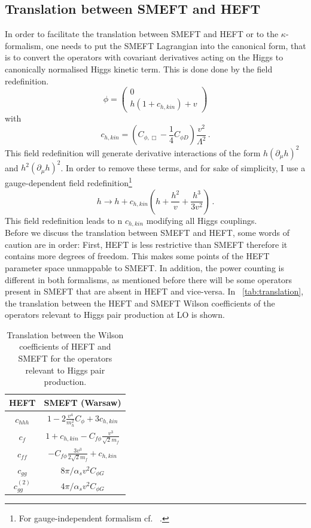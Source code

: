 \subsection{Translation between SMEFT and HEFT }
In order to facilitate the translation between SMEFT and HEFT or to the $\kappa$-formalism, one needs to put the SMEFT Lagrangian into the canonical form, that is to convert the operators with covariant derivatives acting on the Higgs to  canonically normalised Higgs kinetic term. This is done done by the field redefinition.
\begin{equation}
	\phi=\left( \begin{array}{c} 0 \\ h(1+c_{h,kin}) + v \end{array} \right)
\end{equation} 
with 
\begin{equation}
	c_{h,kin}=\left(C_{\phi,\Box}-\frac{1}{4}C_{\phi D}\right) \frac{v^2}{\Lambda^2}\,.
\end{equation}
This field redefinition will generate derivative interactions of the form $h(\partial_{\mu}h)^2$ and $h^2(\partial_{\mu}h)^2$. In order to remove these terms, and for sake of simplicity, I use a gauge-dependent field redefinition\footnote{For gauge-independent formalism cf.~ \cite{Hartmann:2015aia}.}
\begin{equation}
	h \to h + c_{h,kin}\left( h +\frac{h^2}{v}+\frac{h^3}{3v^2}\right)\,. \label{fieldref}
\end{equation}
This field redefinition leads to n $c_{h,kin}$ modifying all Higgs couplings. \\
 Before we discuss the translation between SMEFT and HEFT, some words of caution are in order: First, HEFT is less restrictive than SMEFT therefore it contains more degrees of freedom. This makes some points of the HEFT parameter space unmappable to SMEFT. In addition, the power counting is different in both formalisms, as mentioned before there will be some operators present in SMEFT that are absent in HEFT and vice-versa.  In ~\autoref{tab:translation}, the translation between the HEFT and SMEFT Wilson coefficients of the  operators relevant to Higgs pair production at LO is shown. 
\begin{table}[htb]
	\begin{center}
		\begin{tabular}{ c c }
			\toplinetwo
			HEFT& SMEFT (Warsaw)\\
			\midrule
			$c_{hhh}$&$1-2\frac{v^4}{m_h^2}C_\phi+3c_{h,kin}$ \\
			$c_f$ & $1+c_{h,kin} -C_{f\phi} \frac{v^3}{\sqrt{2} m_f}$\\
			$ c_{ff} $ &$-C_{f\phi} \frac{3 v^3}{2\sqrt{2} m_f} + c_{h,kin}$\\
			$c_{gg}$  & $8\pi/\alpha_s v^2 C_{\phi G}$ \\
			$c_{gg}^{(2)}$  & $4\pi/\alpha_s v^2 C_{\phi G}$ \\
			\bottomrule
		\end{tabular}
	\end{center}
	\caption{Translation between the Wilson coefficients of HEFT and SMEFT for the operators relevant to Higgs pair production. \label{tab:translation}}
\end{table}
